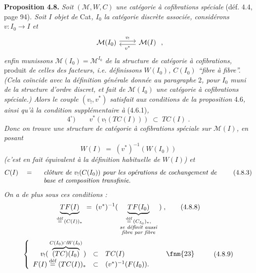 \textbf{Proposition 4.8.} \textit{Soit} $(\mathcal{M}, W, C)$ \textit{une catégorie à cofibrations spéciale} (déf. 4.4, page 94)\textit{. Soit $I$ objet de} Cat\textit{, $I_0$ la catégorie discrète associée, considérons $v : I_0 \longrightarrow I$ et} %
\[
\begin{tikzcd}
\mathcal{M}(I_0) \arrow[r, shift left, "v_{!}"] & \mathcal{M}(I) \arrow[l, shift left, "v^{*}"]
\end{tikzcd} \; ,
\]
\textit{enfin munissons $\mathcal{M}(I_0) = \mathcal{M}^{I_0}$ de la structure de catégorie à cofibrations,} produit \textit{de celles des facteurs, i.e. définissons $W(I_0)$, $C(I_0)$ “fibre à fibre”. (Cela coïncide avec la définition générale donnée au paragraphe} 2\textit{, pour $I_0$ muni de la structure d'ordre discret, et fait de $\mathcal{M}(I_0)$ une catégorie à cofibrations spéciale.) Alors le couple $(v_{!}, v^{*})$ satisfait}  \textit{aux conditions de la proposition} 4.6\textit{, ainsi qu'à la condition supplémentaire à} (4.6.1)\textit{,}
\[
4^{\circ}) \qquad v^{*}(v_{!}(TC(I))) \;\subset\; TC(I) \; .
\tag*{(4.8.1)}
\]
\textit{Donc on trouve une structure de catégorie à cofibrations spéciale sur $\mathcal{M}(I)$, en posant}
\[
W(I) \;=\; (v^{*})^{-1}(W(I_0))
\tag*{(4.8.2)}
\]
\textit{(c'est en fait équivalent à la définition habituelle de $W(I)$) et}
\[
C(I) \quad = \quad
\begin{array}[t]{l}
\textit{clôture de } v_{!}(C(I_0)) \textit{ pour les opérations de cochangement de}\\
\textit{base et composition transfinie.}
\end{array}
\tag*{(4.8.3)}
\]
\textit{On a de plus sous ces conditions :}
\[
\underbrace{TF(I)}_{\defeq\,(C(I))_{*}} \;=\; (v^{*})^{-1}( \; \underbrace{TF(I_0)}_{\substack{\defeq\,(C_{I_0})_{*},\\ \textit{se définit aussi}\\ \textit{fibre par fibre}}} \; ) \; ,
\tag*{(4.8.8)}
\]
\[
\left\{
\begin{array}{rcl}
v_{!}( \, \overbrace{(TC)(I_0)}^{C(I_0)\cap W(I_0)} \, ) & \subset & TC(I) \qquad\qquad\qquad \text{\fnm{23}} \\
F(I) \defeq (TC(I))_{*} & \subset & (v^{*})^{-1}(F(I_0)).
\end{array}
\right.
\tag*{(4.8.9)}
\]

